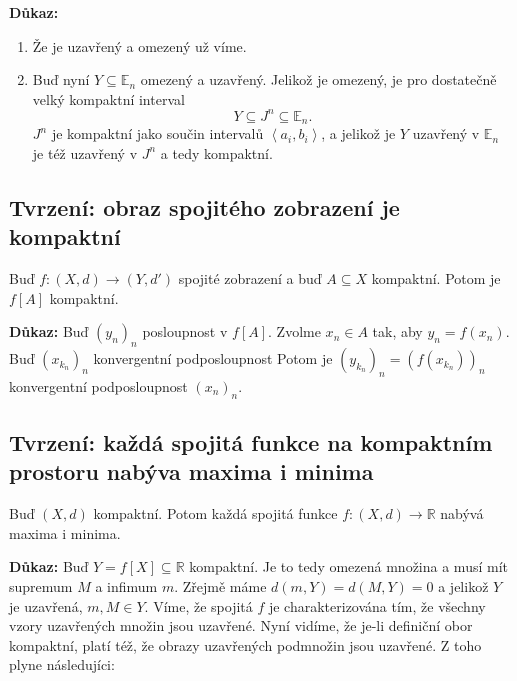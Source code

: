 \documentclass[../main.tex]{subfiles}
\begin{document}
\vspace{5mm}
\noindent
\textbf{Důkaz:} 
\begin{enumerate}
    \item Že je uzavřený a omezený už víme.
    \item Buď nyní $Y \subseteq \mathbb{E}_n$ omezený a uzavřený. Jelikož je omezený, je pro dostatečně velký kompaktní interval
    \[Y \subseteq J^n \subseteq \mathbb{E}_n.\]
    $J^n$ je kompaktní jako součin intervalů $\left<a_i,b_i\right>$, a jelikož je $Y$ uzavřený v $\mathbb{E}_n$ je též uzavřený
    v $J^n$ a tedy kompaktní.
\end{enumerate}

\subsection{Tvrzení: obraz spojitého zobrazení je kompaktní}
\hspace{1.2mm}
\noindent
Buď $f: (X,d) \to (Y, d')$ spojité zobrazení a buď $A \subseteq X$ kompaktní. Potom je $f[A]$ kompaktní.


\vspace{5mm}
\noindent
\textbf{Důkaz:} Buď $(y_n)_n$ posloupnost v $f[A]$. Zvolme $x_n \in A$ tak, aby $y_n = f(x_n)$. Buď $(x_{k_n})_n$ konvergentní podposloupnost
Potom je $(y_{k_n})_n = (f(x_{k_n}))_n$ konvergentní podposloupnost $(x_n)_n$.

\subsection{Tvrzení: každá spojitá funkce na kompaktním prostoru nabýva maxima i minima}
\hspace{1.2mm}
\noindent
Buď $(X,d)$ kompaktní. Potom každá spojitá funkce $f:(X,d)\to \mathbb{R}$ nabývá maxima i minima.

\vspace{5mm}
\noindent
\textbf{Důkaz:} Buď $Y = f[X] \subseteq \mathbb{R}$ kompaktní. Je to tedy omezená množina a musí mít supremum $M$ a infimum $m$. Zřejmě máme 
$d(m,Y) = d(M,Y) = 0$ a jelikož $Y$ je uzavřená, $m,M \in Y$. Víme, že spojitá $f$ je charakterizována tím, že všechny vzory uzavřených množin
jsou uzavřené. Nyní vidíme, že je-li definiční obor kompaktní, platí též, že obrazy uzavřených podmnožin jsou uzavřené. Z toho plyne následujíci:
\end{document}
